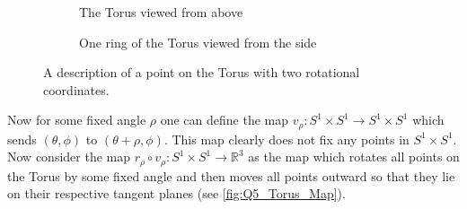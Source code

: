 \documentclass{article}
\begin{document}
\begin{figure}[H]
    \centering
    \begin{subfigure}[b]{0.4\textwidth}
        \centering
    \caption{The Torus viewed from above}
    \end{subfigure}
    \begin{subfigure}[b]{0.4\textwidth}
        \centering
    \caption{One ring of the Torus viewed from the side}
    \end{subfigure}
      \caption{A description of a point on the Torus with two rotational coordinates.}
      \label{fig:Q5_Torus_Coords}
\end{figure}

Now for some fixed angle $\rho$ one can define the map $v_\rho:S^1 \times S^1 \rightarrow S^1 \times S^1$ 
which sends $(\theta,\phi)$ to $(\theta+\rho,\phi)$. This map clearly does not fix any points 
in $S^1 \times S^1$. Now consider the map $r_\rho \circ v_\rho:S^1 \times S^1 \rightarrow \mathbb{R}^3$ 
as the map which rotates all points on the Torus by some fixed angle and then moves all points 
outward so that they lie on their respective tangent planes (see \autoref{fig:Q5_Torus_Map}).
\end{document}
